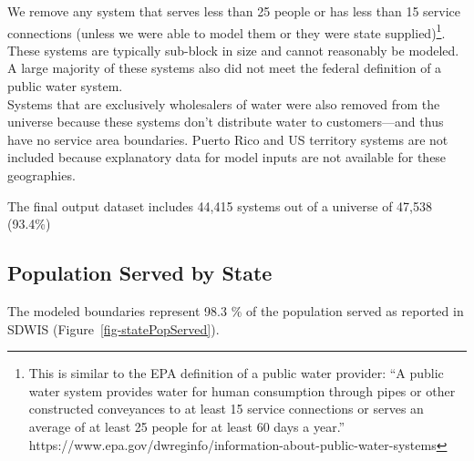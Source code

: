 \documentclass[12pt]{article}
\begin{document}
We remove any system that serves less than 25 people or has less than 15
service connections (unless we were able to model them or they were
state supplied)\footnote{This is similar to the EPA definition of a
  public water provider: ``A public water system provides water for
  human consumption through pipes or other constructed conveyances to at
  least 15 service connections or serves an average of at least 25
  people for at least 60 days a year.''
  https://www.epa.gov/dwreginfo/information-about-public-water-systems}.
These systems are typically sub-block in size and cannot reasonably be
modeled. A large majority of these systems also did not meet the federal
definition of a public water system.\\
Systems that are exclusively wholesalers of water were also removed from
the universe because these systems don't distribute water to
customers---and thus have no service area boundaries. Puerto Rico and US
territory systems are not included because explanatory data for model
inputs are not available for these geographies.

The final output dataset includes 44,415 systems out of a universe of
47,538 (93.4\%)

\subsection{Population Served by
State}\label{population-served-by-state}

The modeled boundaries represent 98.3 \% of the population served as
reported in SDWIS (Figure~\ref{fig-statePopServed}).
\end{document}
